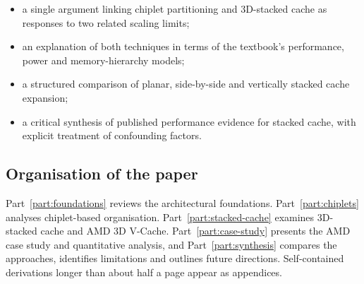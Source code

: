 \begin{itemize}
  \item a single argument linking chiplet partitioning and 3D-stacked cache as responses to two related scaling limits;
  \item an explanation of both techniques in terms of the textbook's performance, power and memory-hierarchy models;
  \item a structured comparison of planar, side-by-side and vertically stacked cache expansion;
  \item a critical synthesis of published performance evidence for stacked cache, with explicit treatment of confounding factors.
\end{itemize}

\subsection{Organisation of the paper}
\label{sec:organisation}

Part~\ref{part:foundations} reviews the architectural foundations. Part~\ref{part:chiplets} analyses chiplet-based organisation. Part~\ref{part:stacked-cache} examines 3D-stacked cache and AMD 3D V-Cache. Part~\ref{part:case-study} presents the AMD case study and quantitative analysis, and Part~\ref{part:synthesis} compares the approaches, identifies limitations and outlines future directions. Self-contained derivations longer than about half a page appear as appendices.
